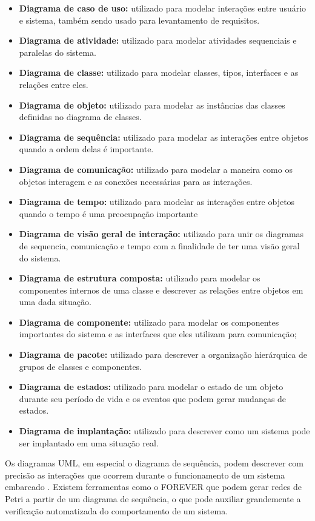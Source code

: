 \begin{itemize}
    \item \textbf{Diagrama de caso de uso:} utilizado para modelar interações entre usuário e sistema, também sendo usado para levantamento de requisitos.
    \item \textbf{Diagrama de atividade:} utilizado para modelar atividades sequenciais e paralelas do sistema.
    \item \textbf{Diagrama de classe:} utilizado para modelar classes, tipos, interfaces e as relações entre eles.
    \item \textbf{Diagrama de objeto:} utilizado para modelar as instâncias das classes definidas no diagrama de classes.
    \item \textbf{Diagrama de sequência:} utilizado para modelar as interações entre objetos quando a ordem delas é importante.
    \item \textbf{Diagrama de comunicação:} utilizado para modelar a maneira como os objetos interagem e as conexões necessárias para as interações.
    \item \textbf{Diagrama de tempo:} utilizado para modelar as interações entre objetos quando o tempo é uma preocupação importante
    \item \textbf{Diagrama de visão geral de interação:} utilizado para unir os diagramas de sequencia, comunicação e tempo com a finalidade de ter uma visão geral do sistema. 
    \item \textbf{Diagrama de estrutura composta:} utilizado para modelar os componentes internos de uma classe e descrever as relações entre objetos em uma dada situação.
    \item \textbf{Diagrama de componente:} utilizado para modelar os componentes importantes do sistema e as interfaces que eles utilizam para comunicação;
    \item \textbf{Diagrama de pacote:} utilizado para descrever a organização hierárquica de grupos de classes e componentes.
    \item \textbf{Diagrama de estados:} utilizado para modelar o estado de um objeto durante seu período de vida e os eventos que podem gerar mudanças de estados.
    \item \textbf{Diagrama de implantação:} utilizado para descrever como um sistema pode ser implantado em uma situação real.
\end{itemize}

Os diagramas UML, em especial o diagrama de sequência, podem descrever com precisão as interações que ocorrem durante o funcionamento de um sistema embarcado \cite{uml_petri}. Existem ferramentas como o FOREVER \cite{forever} que podem gerar redes de Petri a partir de um diagrama de sequência, o que pode auxiliar grandemente a verificação automatizada do comportamento de um sistema.

